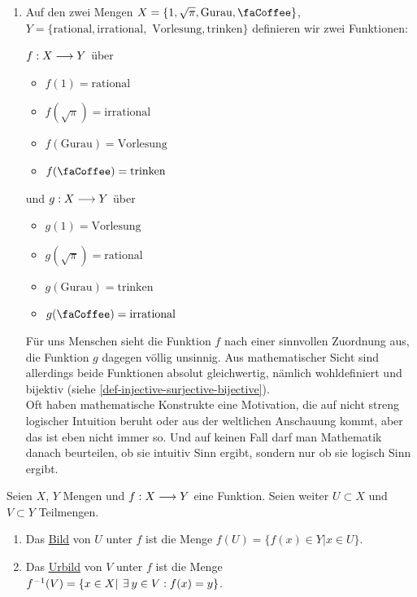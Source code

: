 \begin{example}
    \begin{enumerate}[label=(\arabic*)]
        \item Auf den zwei Mengen $X = \{1, \sqrt{\pi}, \text{Gurau}, \text{\faCoffee} \}$, $Y = \{\text{rational}, \text{irrational},$
        $\text{Vorlesung}, \text{trinken}\}$ definieren wir zwei Funktionen:
        
        $f: X \longrightarrow Y$ über
        \begin{itemize}[label=]
            \item $f(1) = \text{rational}$
            \item $f(\sqrt{\pi}) = \text{irrational}$
            \item $f(\text{Gurau}) = \text{Vorlesung}$
            \item $f(\text{\faCoffee}) = \text{trinken}$
        \end{itemize}
        und $g: X \longrightarrow Y$ über
        \begin{itemize}[label=]
            \item $g(1) = \text{Vorlesung}$
            \item $g(\sqrt{\pi}) = \text{rational}$
            \item $g(\text{Gurau}) = \text{trinken}$
            \item $g(\text{\faCoffee}) = \text{irrational}$
        \end{itemize}
        Für uns Menschen sieht die Funktion $f$ nach einer sinnvollen Zuordnung aus, die Funktion $g$ dagegen völlig unsinnig. Aus mathematischer Sicht sind allerdings beide Funktionen absolut gleichwertig, nämlich wohldefiniert und bijektiv (siehe \ref{def-injective-surjective-bijective}).\\
        Oft haben mathematische Konstrukte eine Motivation, die auf nicht streng logischer Intuition beruht oder aus der weltlichen Anschauung kommt, aber das ist eben nicht immer so. Und auf keinen Fall darf man Mathematik danach beurteilen, ob sie intuitiv Sinn ergibt, sondern nur ob sie logisch Sinn ergibt.
    \end{enumerate}
\end{example}

\begin{definition}
    Seien $X$, $Y$ Mengen und $f: X \longrightarrow Y$ eine Funktion. Seien weiter $U \subset X$ und $V \subset Y$ Teilmengen.
    \begin{enumerate}
        \item Das \underline{Bild} von $U$ unter $f$ ist die Menge $f(U) = \{f(x) \in Y | x \in U\}$.
        \item Das \underline{Urbild} von $V$ unter $f$ ist die Menge $f\m(V) = \{x \in X | \exists y \in V: f(x) = y\}$.
    \end{enumerate}
\end{definition}

